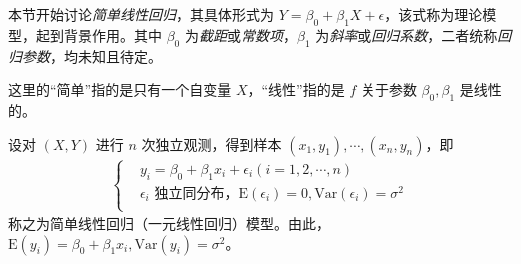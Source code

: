 \documentclass[../main.tex]{subfiles}
\begin{document}
本节开始讨论\emph{简单线性回归}，其具体形式为 $Y=\beta_0+\beta_1X+\epsilon$，该式称为理论模型，起到背景作用。其中 $\beta_0$ 为\emph{截距}或\emph{常数项}，$\beta_1$ 为\emph{斜率}或\emph{回归系数}，二者统称\emph{回归参数}，均未知且待定。

这里的“简单”指的是只有一个自变量 $X$，“线性”指的是 $f$ 关于参数 $\beta_0,\beta_1$ 是线性的。

设对 $(X,Y)$ 进行 $n$ 次独立观测，得到样本 $(x_1,y_1),\cdots,(x_n,y_n)$，即
\begin{align*}
    \left\{
    \begin{aligned}
         & y_i=\beta_0+\beta_1x_i+\epsilon_i(i=1,2,\cdots,n)                                       \\
         & \epsilon_i\text{ 独立同分布，}\mathrm E(\epsilon_i)=0,\mathrm{Var}(\epsilon_i)=\sigma^2 \\
    \end{aligned}
    \right.
\end{align*}
称之为简单线性回归（一元线性回归）模型。由此，$\mathrm E(y_i)=\beta_0+\beta_1x_i,\mathrm{Var}(y_i)=\sigma^2$。
\end{document}

